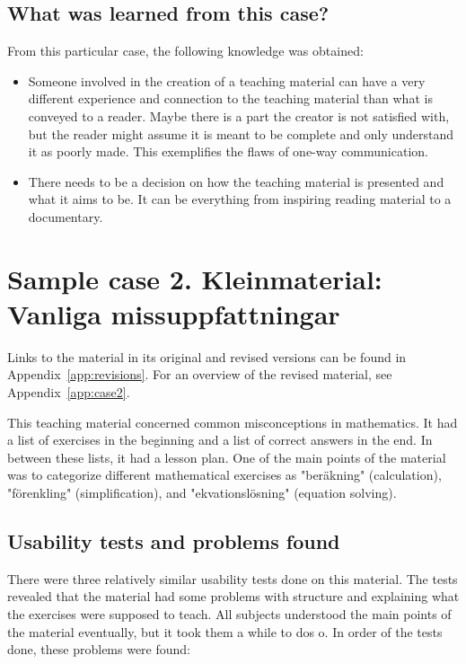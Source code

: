 \subsection{What was learned from this case?}
From this particular case, the following knowledge was obtained:
\begin{itemize}
    \item Someone involved in the creation of a teaching material can have a very different experience and connection to the teaching material than what is conveyed to a reader. Maybe there is a part the creator is not satisfied with, but the reader might assume it is meant to be complete and only understand it as poorly made. This exemplifies the flaws of one-way communication.
    \item There needs to be a decision on how the teaching material is presented and what it aims to be. It can be everything from inspiring reading material to a documentary.
\end{itemize}

\section{Sample case 2. Kleinmaterial: Vanliga missuppfattningar} \label{samplecase2}
Links to the material in its original and revised versions can be found in Appendix~\ref{app:revisions}. For an overview of the revised material, see Appendix~\ref{app:case2}. 

This teaching material concerned common misconceptions in mathematics. It had a list of exercises in the beginning and a list of correct answers in the end. In between these lists, it had a lesson plan. One of the main points of the material was to categorize different mathematical exercises as "beräkning" (calculation), "förenkling" (simplification), and "ekvationslösning" (equation solving).


\subsection{Usability tests and problems found}

There were three relatively similar usability tests done on this material. The tests revealed that the material had some problems with structure and explaining what the exercises were supposed to teach. All subjects understood the main points of the material eventually, but it took them a while to dos o. In order of the tests done, these problems were found:

